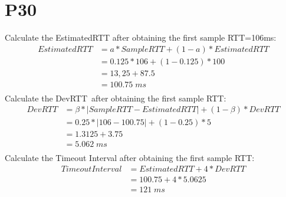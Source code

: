 \documentclass[12pt,a4paper]{article}
\begin{document}
\section*{P30}
Calculate the EstimatedRTT after obtaining the first sample RTT=106ms:
\begin{equation*}
    \begin{split}
        EstimatedRTT &= a * SampleRTT+(1- a) * EstimatedRTT \\
                     &= 0.125 * 106 + (1-0.125) * 100 \\
                     &= 13,25 + 87.5 \\
                     &= 100.75 \; ms \\
    \end{split}
\end{equation*}
Calculate the DevRTT after obtaining the first sample RTT:
\begin{equation*}
    \begin{split}
        DevRTT &= \beta * | SampleRTT- EstimatedRTT|+(1- \beta )* DevRTT \\
                     &= 0.25 * |106-100.75| + (1-0.25) *5 \\
                     &= 1.3125 + 3.75 \\
                     &= 5.062 \; ms \\
    \end{split}
\end{equation*}
Calculate the Timeout Interval after obtaining the first sample RTT:
\begin{equation*}
    \begin{split}
        TimeoutInterval &= EstimatedRTT +4* DevRTT \\
                     &= 100.75 + 4 *5.0625 \\
                     &= 121 \; ms\\
    \end{split}
\end{equation*}
\end{document}

